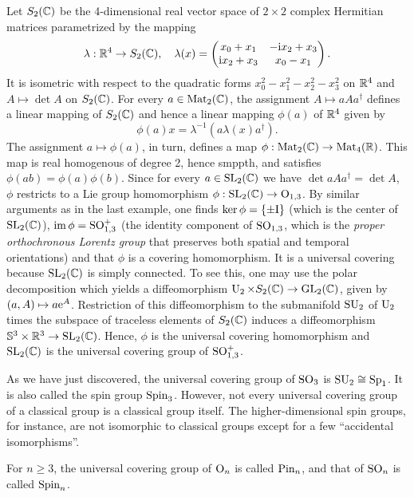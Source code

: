 \begin{example}\label{example so13 and sl2c}
    Let $S_2(\mathbb{C})$ be the 4-dimensional real vector space of $2\times 2$ complex Hermitian matrices parametrized by the mapping
    \[\lambda:\mathbb{R}^4\to S_2(\mathbb{C}),\quad \lambda(x)=
    \begin{pmatrix}
        x_0+x_1&-\mathrm{i} x_2+x_3\\
        \mathrm{i} x_2+x_3&x_0-x_1
    \end{pmatrix}.
    \]
    It is isometric with respect to the quadratic forms $x_0^2-x_1^2-x_2^2-x_3^2$ on $\mathbb{R}^4$ and $A\mapsto \det A$ on $S_2(\mathbb{C})$. For every $a\in\operatorname{Mat}_2(\mathbb{C})$, the assignment $A\mapsto aAa^\dagger$ defines a linear mapping of $S_2(\mathbb{C})$ and hence a linear mapping $\phi(a)$ of $\mathbb{R}^4$ given by
    \[\phi(a)x=\lambda^{-1}\left(a\lambda(x)a^\dagger\right).\]
    The assignment $a\mapsto \phi(a)$, in turn, defines a map $\phi:\operatorname{Mat}_2(\mathbb{C})\to \operatorname{Mat}_4(\mathbb{R})$. This map is real homogenous of degree 2, hence smppth, and satisfies $\phi(ab)=\phi(a)\phi(b)$. Since for every $a\in\operatorname{SL}_2(\mathbb{C})$ we have $\det aAa^\dagger =\det A$, $\phi$ restricts to a Lie group homomorphism $\phi:\operatorname{SL}_2(\mathbb{C})\to \operatorname{O}_{1,3}$. By similar arguments as in the last example, one finds $\ker\phi=\{\pm \mathrm{I}\}$ (which is the center of $\operatorname{SL}_2(\mathbb{C})$), $\operatorname{im}\phi=\operatorname{SO}^+_{1,3}$ (the identity component of $\operatorname{SO}_{1,3}$, which is the \emph{proper orthochronous Lorentz group} that preserves both spatial and temporal orientations) and that $\phi$ is a covering homomorphism. It is a universal covering because $\operatorname{SL}_2(\mathbb{C})$ is simply connected. To see this, one may use the polar decomposition which yields a diffeomorphism $\operatorname{U}_2\times S_2(\mathbb{C})\to \operatorname{GL}_2(\mathbb{C})$, given by $(a,A)\mapsto a\mathrm{e}^A$. Restriction of this diffeomorphism to the submanifold $\operatorname{SU}_2$ of $\operatorname{U}_2$ times the subspace of traceless elements of $S_2(\mathbb{C})$ induces a diffeomorphism $\mathbb{S}^3\times \mathbb{R}^3\to \operatorname{SL}_2(\mathbb{C})$. Hence, $\phi$ is the universal covering homomorphism and $\operatorname{SL}_2(\mathbb{C})$ is the universal covering group of $\operatorname{SO}^+_{1,3}$.
\end{example}

As we have just discovered, the universal covering group of $\operatorname{SO}_3$ is $\operatorname{SU}_2\cong\operatorname{Sp}_1$. It is also called the spin group $\operatorname{Spin}_3$. However, not every universal covering group of a classical group is a classical group itself. The higher-dimensional spin groups, for instance, are not isomorphic to classical groups except for a few ``accidental isomorphisms''.

\begin{defn}
    For $n\geq 3$, the universal covering group of  $\operatorname{O}_n$ is called $\operatorname{Pin}_n$, and that of $\operatorname{SO}_n$ is called $\operatorname{Spin}_n$.
\end{defn}

